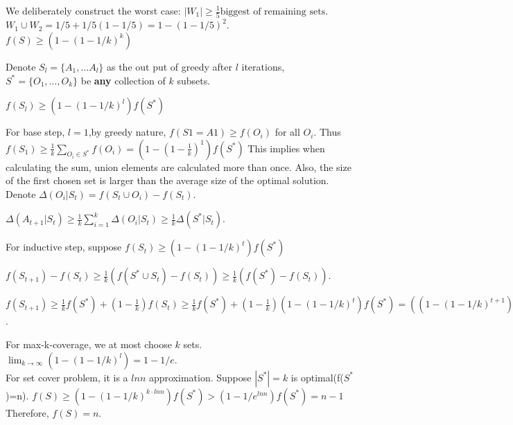 We deliberately construct the worst case:
$|W_1|\geq \frac{1}{5}\text{biggest of remaining sets}$.
$W_1\cup W_2=1/5+1/5(1-1/5)=1-(1-1/5)^2$.
$f(S)\geq (1-(1-1/k)^k)$
\begin{lemma}
    Denote $S_l=\{A_1,\ldots A_l\}$ as the out put of greedy after $l$ iterations, $S^*=\{O_1,\ldots, O_k\}$ be \textbf{any} collection of $k$ subsets.

$f(S_l)\geq (1-(1-1/k)^l)f(S^*)$
\end{lemma}
\begin{prf}
    For base step, $l=1$,by greedy nature, $f(S1={A1})\geq f({O_i})$ for all $O_i$.
    Thus $f(S_1)\geq \frac{1}{k}\sum_{O_i \in S^*}f({O_i})=(1-(1-\frac{1}{k})^1)f(S^*)$ This implies when calculating the sum, union elements are calculated more than once.
    Also, the size of the first chosen set is larger than the average size of the optimal solution.
    Denote $\Delta(O_i|S_t)=f(S_t\cup {O_i})-f(S_t)$.

    $\Delta(A_{t+1}|S_t)\geq\frac{1}{k}\sum_{i=1}^k\Delta(O_i|S_t) \geq \frac{1}{k}\Delta(S^*|S_t)$.

    For inductive step, suppose $f(S_t)\geq (1-(1-1/k)^t)f(S^*) $ 

    $f(S_{t+1})-f(S_t)\geq \frac{1}{k}(f(S^*\cup S_t)-f(S_t))\geq \frac{1}{k}(f(S^*)-f(S_t))$.
    
    $f(S_{t+1})\geq \frac{1}{k}f(S^*) + (1-\frac{1}{k})f(S_t)
    \geq \frac{1}{k}f(S^*) + (1-\frac{1}{k})(1-(1-1/k)^t)f(S^*)=((1-(1-1/k)^{t+1})f(S^*))$.
\end{prf}
For max-k-coverage, we at most choose $k$ sets.
$\lim_{k\rightarrow \infty}(1-(1-1/k)^l) =1-1/e$.\\
For set cover problem, it is a $ln n$ approximation. Suppose $|S^*|=k$ is optimal(f($S^*$)=n).
$f(S)\geq (1-(1-1/k)^{k\cdot ln n})f(S^*)>(1-1/e^{ln n})f(S^*)=n-1$ Therefore, $f(S)=n$.

